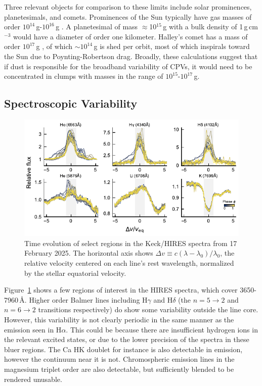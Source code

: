 \documentclass{nature3}
\begin{document}
\begin{methods}
Three relevant objects for comparison to these limits include solar
prominences, planetesimals, and comets.
Prominences of the Sun typically have gas masses
of order $10^{14}$\,g-$10^{16}$\,g \cite{VialEngvold2015}.
A planetesimal of mass $\approx$10$^{15}$\,g with a bulk density of
1\,g\,cm$^{-3}$ would have a diameter of order one kilometer.
Halley's comet has a mass of order $10^{17}$\,g \cite{Rickman1989}, of
which $\sim$$10^{14}$\,g is shed per orbit, most of which inspirals
toward the Sun due to Poynting-Robertson drag.
Broadly, these calculations suggest that if dust is responsible for
the broadband variability of CPVs, it would need to be concentrated in
clumps with masses in the range of $10^{15}$-$10^{17}$\,g.



\subsection{Spectroscopic Variability}\phantom{+}

\begin{figure}[!t]
  \centering
  \includegraphics[width=\textwidth]{figures/sf5.pdf}
  \caption{Time evolution of select regions in the Keck/HIRES
  spectra from 17 February 2025.
  The horizontal axis shows $\Delta v \equiv c (\lambda -
  \lambda_0)/\lambda_0$, the relative velocity centered on each line's
  rest wavelength, normalized by the stellar equatorial velocity.
  }
  \label{fig:hirescuts}
\end{figure}

Figure~\ref{fig:hirescuts} shows a few regions of interest in the HIRES
spectra, which cover 3650-7960\,\AA.
Higher order Balmer lines including H$\gamma$ and H$\delta$ (the
$n=5\rightarrow2$ and $n=6\rightarrow2$ transitions respectively) do
show some variability outside the line core.
However, this variability is not clearly periodic in the
same manner as the emission seen in H$\alpha$.
This could be because there are insufficient hydrogen ions in the
relevant excited states, or due to the lower precision of the spectra
in these bluer regions.
The Ca HK doublet for instance is also detectable in emission, however
the continuum near it is not.
Chromospheric emission lines in the magnesium triplet order are
also detectable, but sufficiently blended to be rendered unusable.


\end{methods}
\end{document}
